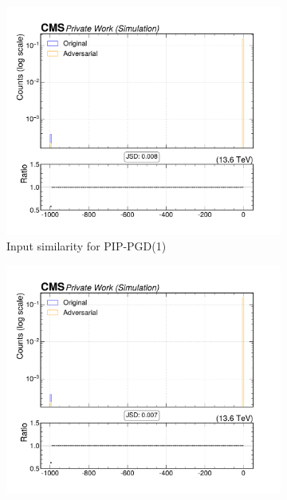 \begin{figure}[htbp]
  \centering
  \begin{subfigure}[t]{0.32\textwidth}
    \includegraphics[width=\linewidth]{media/output/features/compare/combined_it_1/cmp_global_features_TagVarCSV_trackSip2dValAboveCharm.pdf}
    \caption*{Input similarity for PIP-PGD(1)}
  \end{subfigure}\hfill
  \begin{subfigure}[t]{0.32\textwidth}
    \includegraphics[width=\linewidth]{media/output/features/compare/combined_it_2/cmp_global_features_TagVarCSV_trackSip2dValAboveCharm.pdf}

\end{subfigure}
\end{figure}
